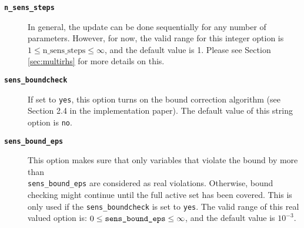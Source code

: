 \documentclass[letter, 11pt]{article}
\newcommand{\selectstep}{select\_step}
\newcommand{\nstepsopt}{n\_sens\_steps}
\newcommand{\boundcheckopt}{sens\_boundcheck}
\newcommand{\boundepsopt}{sens\_bound\_eps}
\begin{document}
\begin{description}

%
%

\item[\texttt{\textbf{\nstepsopt}}]  In general, the update can be done sequentially for any number of parameters. However,
                  for now, the valid range for this integer option is $1 \leq \mbox{\nstepsopt} \leq \infty$,
                  and the default value is 1. Please see Section \ref{sec:multirhs} for more details on this.

\item[\texttt{\textbf{\boundcheckopt}}]  If set to \texttt{yes}, this option turns on the bound correction algorithm (see Section 2.4 in the
           implementation paper). The default value of this string option is \texttt{no}.

\item[\texttt{\textbf{\boundepsopt}}] This option makes sure that only variables that violate the bound by more than\\ {\texttt{\boundepsopt}}
   are considered as real violations. Otherwise,  bound checking might continue until the full active set has been covered.
   This is only used if the \texttt{\boundcheckopt} is set to \texttt{yes}. The valid range of this real valued option is:
   $0 \leq \mbox{\texttt{\boundepsopt}} \leq \infty$, and the default value is $10^{-3}$.


\end{description}
\end{document}
